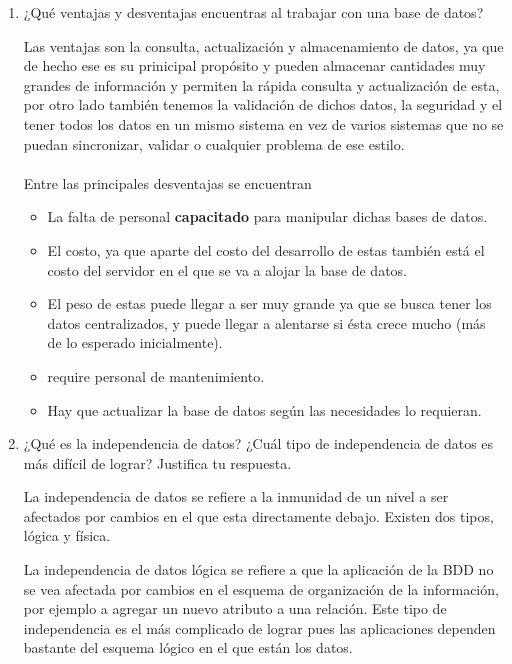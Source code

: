 \documentclass[12pt,a4paper]{article}
\begin{document}
\begin{enumerate}
\begin{enumerate}
			\item ¿Qué ventajas y desventajas encuentras al trabajar con una base de datos?
			
                        	Las ventajas son la consulta, actualización y almacenamiento de datos, ya que de hecho ese es su prinicipal propósito y 			        pueden almacenar cantidades muy grandes de información y permiten la rápida consulta y actualización de esta, por otro                                   lado también tenemos la validación de dichos datos, la seguridad y el tener todos los datos en un mismo sistema en vez                                   de varios sistemas que no se puedan sincronizar, validar o cualquier problema de ese estilo.\\ \\
    
    			 	Entre las principales desventajas se encuentran\\
      				\begin{itemize}
     				\item La falta de personal \textbf{capacitado} para manipular dichas bases de datos.
   			        \item El costo, ya que aparte del costo del desarrollo de estas también está el costo del servidor en el que se va a 	                                 alojar la base de datos.
    				\item El peso de estas puede llegar a ser muy grande ya que se busca tener los datos centralizados, y puede llegar a                                     alentarse si ésta crece mucho (más de lo esperado inicialmente).
   			        \item require personal de mantenimiento.
                                \item Hay que actualizar la base de datos según las necesidades lo requieran.
                                \end{itemize}				
				
			\item ¿Qué es la independencia de datos? ¿Cuál tipo de independencia de datos es más difícil de lograr?
				Justifica tu respuesta.
				
			La independencia de datos se refiere a la inmunidad de un nivel a ser afectados por cambios	en el que esta directamente debajo. Existen dos tipos, lógica y física.

La independencia de datos lógica se refiere a que la aplicación de la BDD no se vea afectada por cambios en el esquema de organización de la información, por ejemplo a agregar un nuevo atributo a una relación. Este tipo de independencia es el más complicado de lograr pues las aplicaciones dependen bastante del esquema lógico en el que están los datos.


\end{enumerate}
\end{enumerate}
\end{document}
